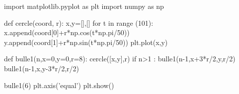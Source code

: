 \documentclass[10pt,fleqn]{article} %
\begin{document}
\begin{multicols}{2}
\ifprof
\begin{corrige}
\begin{python}
import matplotlib.pyplot as plt
import numpy as np

def cercle(coord, r):
    x,y=[],[]
    for t in range (101):
        x.append(coord[0]+r*np.cos(t*np.pi/50))
        y.append(coord[1]+r*np.sin(t*np.pi/50))
    plt.plot(x,y)
    
    
def bulle1(n,x=0,y=0,r=8):
    cercle([x,y],r)
    if n>1 :
        bulle1(n-1,x+3*r/2,y,r/2)
        bulle1(n-1,x,y-3*r/2,r/2)

bulle1(6)
plt.axis('equal')
plt.show()
\end{python}
\end{corrige}
\else
\fi
\end{multicols}

\end{document}
